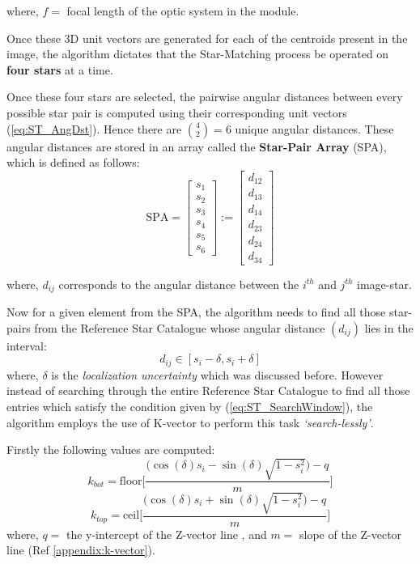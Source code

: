 \documentclass[../../main.tex]{subfiles}
\begin{document}
where, $f = $ focal length of the optic system in the module.

Once these 3D unit vectors are generated for each of the centroids present in the image, the algorithm dictates that the Star-Matching process be operated on \textbf{four stars} at a time.

Once these four stars are selected, the pairwise angular distances between every possible star pair is computed using their corresponding unit vectors (\ref{eq:ST_AngDst}). Hence there are $\binom 4 2 = 6$ unique angular distances.
These angular distances are stored in an array called the \textbf{Star-Pair Array} (SPA), which is defined as follows:
\begin{equation}
    \text{SPA} = \begin{bmatrix}s_1\\ s_2\\ s_3\\ s_4\\ s_5\\ s_6\end{bmatrix} := \begin{bmatrix} d_{12} \\ d_{13} \\ d_{14} \\ d_{23} \\ d_{24} \\ d_{34} \end{bmatrix}
\end{equation}

where, $d_{ij}$ corresponds to the angular distance between the $i^{th}$ and $j^{th}$ image-star.

Now for a given element from the SPA, the algorithm needs to find all those star-pairs from the Reference Star Catalogue whose angular distance $(d_{ij})$ lies in the interval:
\begin{equation}
    d_{ij} \in [s_i-\delta, s_i+\delta]
    \label{eq:ST_SearchWindow}
\end{equation}
where, $\delta$ is the \textit{localization uncertainty} which was discussed before. However instead of searching through the entire Reference Star Catalogue to find all those entries which satisfy the condition given by (\ref{eq:ST_SearchWindow}), the algorithm employs the use of K-vector to perform this task \textit{`search-lessly'}.

Firstly the following values are computed:
\begin{equation}
    k_{bot} = \text{floor}\bigg[ \frac{\big(\cos(\delta)s_i - \sin(\delta)\sqrt{1 - s^2_i} \big)- q}{m} \bigg]
\end{equation}
\begin{equation}
    k_{top} = \text{ceil}\bigg[ \frac{\big(\cos(\delta)s_i + \sin(\delta)\sqrt{1 - s^2_i} \big)- q}{m} \bigg]
\end{equation}
where, $q=$ the y-intercept of the Z-vector line , and $m=$ slope of the Z-vector line (Ref \ref{appendix:k-vector}).
\end{document}
